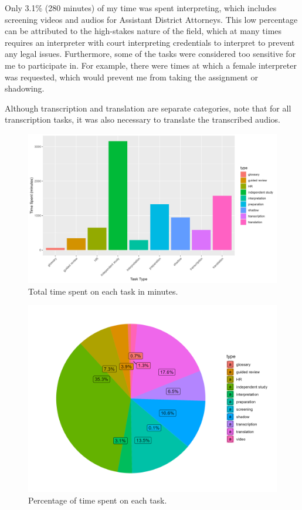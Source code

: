 \documentclass{article}
\begin{document}
Only 3.1\% (280 minutes) of my time was spent interpreting, which includes screening videos and audios for Assistant District Attorneys. This low percentage can be attributed to the high-stakes nature of the field, which at many times requires an interpreter with court interpreting credentials to interpret to prevent any legal issues. Furthermore, some of the tasks were considered too sensitive for me to participate in. For example, there were times at which a female interpreter was requested, which would prevent me from taking the assignment or shadowing.
	
Although transcription and translation are separate categories, note that for all transcription tasks, it was also necessary to translate the transcribed audios. 

\begin{figure}[H]
	\centering
	\includegraphics[width=\textwidth]{../figures/bar.png}
	\caption{Total time spent on each task in minutes.}
	\label{fig:bar}
\end{figure}

\begin{figure}[H]
	\centering
	\includegraphics[width=\textwidth]{../figures/pie.png}
	\caption{Percentage of time spent on each task.}
	\label{fig:pie}
\end{figure}
\end{document}
